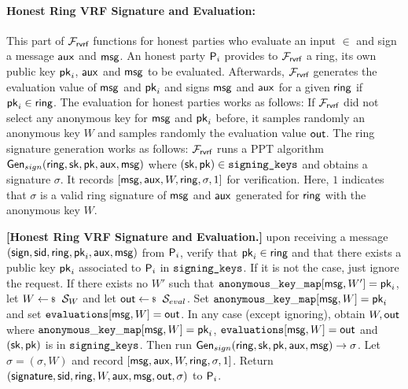 \paragraph{Honest Ring VRF Signature and Evaluation:} This part of $ \mathcal{F}_{\textsf{rvrf}} $ functions for honest parties who evaluate an input $ \in $ and sign a message $ \mathsf{aux} $ and $ \mathsf{msg} $. An honest party $ \mathsf{P}_i $  provides to $ \mathcal{F}_{\textsf{rvrf}} $ a ring, its own public key $ \mathsf{pk}_i $, $ \mathsf{aux} $ and  $ \mathsf{msg} $ to be  evaluated. Afterwards, $ \mathcal{F}_{\textsf{rvrf}} $ generates the evaluation value of $ \mathsf{msg} $ and $ \mathsf{pk}_i $ and signs $ \mathsf{msg} $ and $ \mathsf{aux} $ for a given $ \mathsf{ring} $ if $ \mathsf{pk}_i \in \mathsf{ring} $. The evaluation for honest parties works as follows: If $ \mathcal{F}_{\textsf{rvrf}} $ did not select any anonymous key for $ \mathsf{msg} $ and $ \mathsf{pk}_i $ before, it samples randomly an anonymous key $ W $ and samples randomly the evaluation value $ {\mathsf{out}} $. The ring signature generation works as follows:  $ \mathcal{F}_{\textsf{rvrf}} $ runs a PPT algorithm $ \mathsf{Gen}_{sign}(\mathsf{ring}, \mathsf{sk},\mathsf{pk},\mathsf{aux},\mathsf{msg}) $ where $ (\mathsf{sk},\mathsf{pk}) \in \texttt{signing\_keys} $ and obtains a signature $ \sigma $. It records $  [\mathsf{msg},\mathsf{aux}, W, \mathsf{ring},\sigma, 1]  $ for verification. Here, $ 1 $ indicates that $ \sigma  $ is a valid ring signature of $ \mathsf{msg} $ and $ \mathsf{aux} $ generated for $ \mathsf{ring} $ with the anonymous key $ W $.

\begin{tcolorbox}[left=2pt,right=2pt]
	\eprint{}{\scriptsize}
	\textbf{[Honest Ring VRF Signature and Evaluation.]} upon receiving a message $(\mathsf{sign}, \textsf{sid}, \mathsf{ring}, \mathsf{pk}_i,\mathsf{aux}, \mathsf{msg})$ from $\mathsf{P}_i$, verify that $\mathsf{pk}_i \in \mathsf{ring}$ and that there exists a public key $\mathsf{pk}_i$ associated to $\mathsf{P}_i$ in $ \texttt{signing\_keys} $. If it is not the case, just ignore the request. 	
	If there exists no $ W' $ such that $ \mathtt{anonymous\_key\_map}[\mathsf{msg},W'] =  \mathsf{pk}_i $, let $ W \leftsample \setsym{S}_W $ and let $\Out \leftsample \setsym{S}_{eval}$. Set $ \mathtt{anonymous\_key\_map}[\mathsf{msg},W] = \mathsf{pk}_i $ and set $ \texttt{evaluations}[\mathsf{msg}, W] = {\mathsf{out}}$.
	In any case (except ignoring), obtain $ W, {\mathsf{out}}$ where $ \mathtt{anonymous\_key\_map}[\mathsf{msg},W] =\mathsf{pk}_i $, $ \texttt{evaluations}[\mathsf{msg}, W] = {\mathsf{out}}$ and  $ (\mathsf{sk}, \mathsf{pk}) $ is in $\texttt{signing\_keys} $. Then run  $ \mathsf{Gen}_{sign}(\mathsf{ring},\mathsf{sk},\mathsf{pk},\mathsf{aux},\mathsf{msg}) \rightarrow \sigma $.
	Let $ \sigma = (\sigma,W)$ and record $ [\mathsf{msg},\mathsf{aux}, W, \mathsf{ring},\sigma, 1] $. Return $(\mathsf{signature}, \textsf{sid}, \mathsf{ring},W,\mathsf{aux},\mathsf{msg}, {\mathsf{out}}, \sigma)$ to $\mathsf{P}_i$.
\end{tcolorbox}






